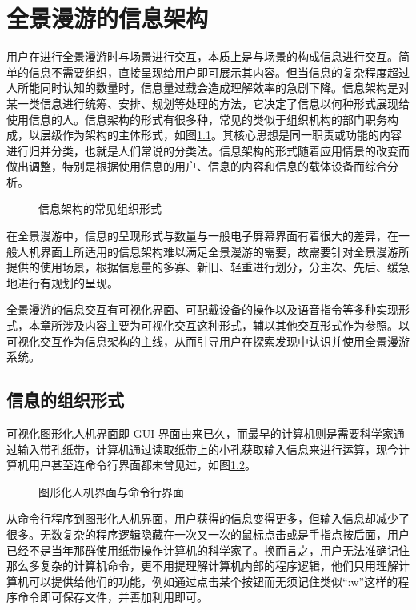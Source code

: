 \chapter{全景漫游的信息架构}

用户在进行全景漫游时与场景进行交互，本质上是与场景的构成信息进行交互。简单的信息不需要组织，直接呈现给用户即可展示其内容。但当信息的复杂程度超过人所能同时认知的数量时，信息量过载会造成理解效率的急剧下降。信息架构是对某一类信息进行统筹、安排、规划等处理的方法，它决定了信息以何种形式展现给使用信息的人。信息架构的形式有很多种，常见的类似于组织机构的部门职务构成，以层级作为架构的主体形式，如图\ref{fig:structure}。其核心思想是同一职责或功能的内容进行归并分类，也就是人们常说的分类法。信息架构的形式随着应用情景的改变而做出调整，特别是根据使用信息的用户、信息的内容和信息的载体设备而综合分析。

\begin{figure}[htp]
\centering
{}
\caption{信息架构的常见组织形式}
\label{fig:structure}
\end{figure}


在全景漫游中，信息的呈现形式与数量与一般电子屏幕界面有着很大的差异，在一般人机界面上所适用的信息架构难以满足全景漫游的需要，故需要针对全景漫游所提供的使用场景，根据信息量的多寡、新旧、轻重进行划分，分主次、先后、缓急地进行有规划的呈现。

全景漫游的信息交互有可视化界面、可配戴设备的操作以及语音指令等多种实现形式，本章所涉及内容主要为可视化交互这种形式，辅以其他交互形式作为参照。以可视化交互作为信息架构的主线，从而引导用户在探索发现中认识并使用全景漫游系统。

\section{信息的组织形式}
可视化图形化人机界面即 GUI 界面由来已久，而最早的计算机则是需要科学家通过输入带孔纸带，计算机通过读取纸带上的小孔获取输入信息来进行运算，现今计算机用户甚至连命令行界面都未曾见过，如图\ref{fig:gui&cli}。

\begin{figure}[htp]
\centering
{}
\caption{图形化人机界面与命令行界面}
\label{fig:gui&cli}
\end{figure}

从命令行程序到图形化人机界面，用户获得的信息变得更多，但输入信息却减少了很多。无数复杂的程序逻辑隐藏在一次又一次的鼠标点击或是手指点按后面，用户已经不是当年那群使用纸带操作计算机的科学家了。换而言之，用户无法准确记住那么多复杂的计算机命令，更不用提理解计算机内部的程序逻辑，他们只用理解计算机可以提供给他们的功能，例如通过点击某个按钮而无须记住类似“:w”这样的程序命令即可保存文件，并善加利用即可。

